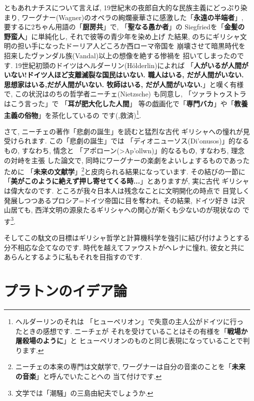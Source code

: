 \documentclass[b5j,8pt,twocolumn]{ltjsarticle}
\newcommand{\textgreek}[1]{\begingroup\fontencoding{LGR}\selectfont#1\endgroup}
\newcommand{\textgreek}[1]{\begingroup\fontencoding{LGR}\selectfont#1\endgroup}
\begin{document}
ともあれナチスについて言えば, 19世紀末の夜郎自大的な民族主義にどっぷり染まり,
 ワーグナー(Wagner)のオペラの絢爛豪華さに感激した「\textbf{永遠の半端者}」,
 要するに2ちゃん用語の「\textbf{厨房共}」で, 「\textbf{聖なる愚か者}」の
Siegfriedを「\textbf{金髪の野蛮人}」に単純化し, それで彼等の青少年を染め上げ
た結果, のちにギリシャ文明の担い手になったドーリア人どころか西ローマ帝国を
崩壊させて暗黒時代を招来したヴァンダル族(Vandal)以上の想像を絶する惨禍を
招いてしまったのです. 19世紀初頭のドイツはヘルダーリン(H\"olderlin)によれば
「\textbf{人がいるが人間がいない!ドイツ人ほど支離滅裂な国民はいない.
 職人はいる, だが人間がいない. 思想家はいる,だが人間がいない. 牧師はいる,
 だが人間がいない.}」と嘆く有様で,  この状況はのちの哲学者ニーチェ(Nietzsche)
も同意し, 「ツァラトゥストラはこう言った」で 「\textbf{耳が肥大化した人間}」
等の戯画化で「\textbf{専門バカ}」や「\textbf{教養主義の俗物}」を茶化しているの
です(\cite{ツァラトゥストラ},救済)\footnote{ヘルダーリンのそれは
「ヒューペリオン」で失意の主人公がドイツに行ったときの感想です. ニーチェが
それを受けていることはその有様を「\textbf{戦場か屠殺場のように}」と
ヒューペリオンのものと同じ表現になっていることで判ります.}.
\newline

さて, ニーチェの著作「悲劇の誕生」\cite{悲劇の誕生}を読むと猛烈な古代
ギリシャへの憧れが見受けられます. この「悲劇の誕生」では
「ディオニューソス(\textgreek{Di'onusos})」的なるもの, すなわち, 情念と
「アポローン(\textgreek{>Ap'ollwn})」的なるもの, すなわち, 理念の対峙を主張
した論文で, 同時にワーグナーの楽劇をよいしょするものであったために
「\textbf{未来の文献学}」\footnote{ニーチェの本来の専門は文献学で,
 ワーグナーは自分の音楽のことを「\textbf{未来の音楽}」と呼んでいたことへの
当て付けです.}と皮肉られる結果になっています. その結びの一節に
「\textbf{美がこのように絶えず押し寄せてくる時...}」とありますが, 実に古代
ギリシャは偉大なのです. ところが我々日本人は残念なことに文明開化の時点で
目覚しく発展しつつあるプロシア=ドイツ帝国に目を奪われ, その結果, ドイツ好き
は沢山居ても, 西洋文明の源泉たるギリシャへの関心が斯くも少ないのが現状なの
です\footnote{文学では「潮騒」の三島由紀夫でしょうか.}.
\newline

そしてこの駄文の目標はギリシャ哲学と計算機科学を強引に結び付けようとする
分不相応な企てなのです. 時代を越えてファウストがヘレナに憧れ, 彼女と共に
あらんとするように私もそれを目指すのです.

\section{プラトンのイデア論}
\end{document}
